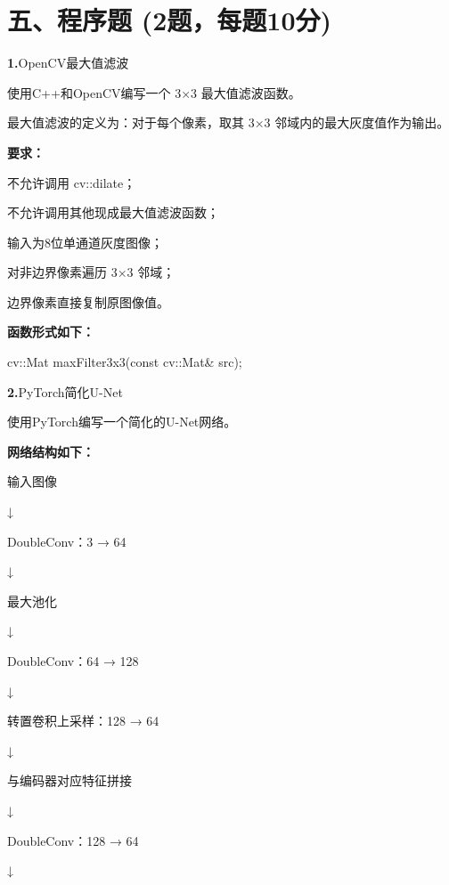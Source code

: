 \documentclass[UTF8,openany,oneside,zihao=-4,fontset=windows]{ctexbook}
\newif\ifshowsolutions
\newcommand{\Question}[2]{%
  \par\Needspace{4\baselineskip}\medskip
  \noindent\textbf{\color{MVBlue}#1}\quad #2\par
}
\newcommand{\PracticeSpace}[1]{\ifshowsolutions\else\par\vspace{#1}\par\fi}
\begin{document}
\section{五、程序题 (2题，每题10分)}
\Question{1.}{OpenCV最大值滤波}
\par 使用C++和OpenCV编写一个 3×3 最大值滤波函数。
\par 最大值滤波的定义为：对于每个像素，取其 3×3 邻域内的最大灰度值作为输出。
\par\noindent\textbf{要求：}
\par\noindent\textbullet\quad 不允许调用 cv::dilate；
\par\noindent\textbullet\quad 不允许调用其他现成最大值滤波函数；
\par\noindent\textbullet\quad 输入为8位单通道灰度图像；
\par\noindent\textbullet\quad 对非边界像素遍历 3×3 邻域；
\par 边界像素直接复制原图像值。
\par\noindent\textbf{函数形式如下：}
\begin{CodeBlock}
cv::Mat maxFilter3x3(const cv::Mat& src);
\end{CodeBlock}
\PracticeSpace{5.5cm}
\Question{2.}{PyTorch简化U-Net}
\par 使用PyTorch编写一个简化的U-Net网络。
\par\noindent\textbf{网络结构如下：}
\par 输入图像
\begin{CodeBlock}
    ↓
\end{CodeBlock}
\par DoubleConv：3 → 64
\begin{CodeBlock}
    ↓
\end{CodeBlock}
\par 最大池化
\begin{CodeBlock}
    ↓
\end{CodeBlock}
\par DoubleConv：64 → 128
\begin{CodeBlock}
    ↓
\end{CodeBlock}
\par 转置卷积上采样：128 → 64
\begin{CodeBlock}
    ↓
\end{CodeBlock}
\par 与编码器对应特征拼接
\begin{CodeBlock}
    ↓
\end{CodeBlock}
\par DoubleConv：128 → 64
\begin{CodeBlock}
    ↓
\end{CodeBlock}
\end{document}
